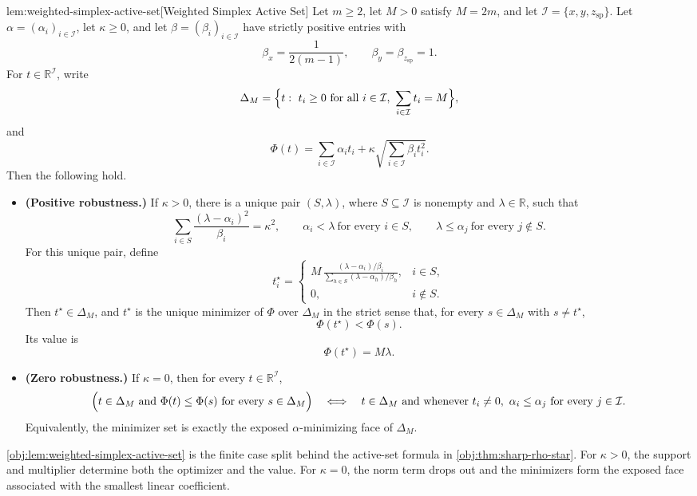 \begin{lemmav}{lem:weighted-simplex-active-set}[Weighted Simplex Active Set]
Let \(m\ge 2\), let \(M>0\) satisfy \(M=2m\), and let
\(\mathcal I=\{x,y,z_{\mathrm{sp}}\}\). Let
\(\alpha=(\alpha_i)_{i\in\mathcal I}\), let \(\kappa\ge 0\), and let
\(\beta=(\beta_i)_{i\in\mathcal I}\) have strictly positive entries with
\[
  \beta_x=\frac{1}{2(m-1)},\qquad
  \beta_y=\beta_{z_{\mathrm{sp}}}=1 .
\]
For \(t\in\mathbb R^{\mathcal I}\), write
\[
  \Delta_M=\Bigl\{t:\ t_i\ge 0\ \text{for all }i\in\mathcal I,\ 
  \sum_{i\in\mathcal I}t_i=M\Bigr\},
\]
and
\[
  \Phi(t)=\sum_{i\in\mathcal I}\alpha_i t_i
  +\kappa\sqrt{\sum_{i\in\mathcal I}\beta_i t_i^2}.
\]
Then the following hold.
\begin{itemize}
\item \textbf{(Positive robustness.)} If \(\kappa>0\), there is a unique pair
\((S,\lambda)\), where \(S\subseteq\mathcal I\) is nonempty and
\(\lambda\in\mathbb R\), such that
\[
  \sum_{i\in S}\frac{(\lambda-\alpha_i)^2}{\beta_i}=\kappa^2,\qquad
  \alpha_i<\lambda\ \text{for every }i\in S,\qquad
  \lambda\le \alpha_j\ \text{for every }j\notin S .
\]
For this unique pair, define
\[
  t_i^\star=
  \begin{cases}
  \displaystyle
  M\,\frac{(\lambda-\alpha_i)/\beta_i}
  {\sum_{h\in S}(\lambda-\alpha_h)/\beta_h}, & i\in S,\\[1.1em]
  0, & i\notin S .
  \end{cases}
\]
Then \(t^\star\in\Delta_M\), and \(t^\star\) is the unique minimizer of
\(\Phi\) over \(\Delta_M\) in the strict sense that, for every
\(s\in\Delta_M\) with \(s\ne t^\star\),
\[
  \Phi(t^\star)<\Phi(s).
\]
Its value is
\[
  \Phi(t^\star)=M\lambda .
\]

\item \textbf{(Zero robustness.)} If \(\kappa=0\), then for every
\(t\in\mathbb R^{\mathcal I}\),
\[
  \Bigl(t\in\Delta_M\ \text{and}\ 
  \Phi(t)\le \Phi(s)\ \text{for every }s\in\Delta_M\Bigr)
  \quad\Longleftrightarrow\quad
  t\in\Delta_M\ \text{and whenever }t_i\ne 0,\ 
  \alpha_i\le \alpha_j\ \text{for every }j\in\mathcal I .
\]
Equivalently, the minimizer set is exactly the exposed
\(\alpha\)-minimizing face of \(\Delta_M\).
\end{itemize}
\end{lemmav}

\cref{obj:lem:weighted-simplex-active-set} is the finite case split behind the active-set formula in \cref{obj:thm:sharp-rho-star}. For \(\kappa>0\), the support and multiplier determine both the optimizer and the value. For \(\kappa=0\), the norm term drops out and the minimizers form the exposed face associated with the smallest linear coefficient.

